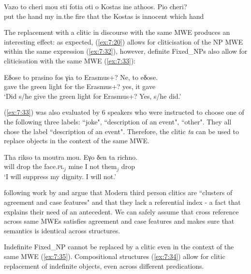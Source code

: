 \documentclass[output=paper]{langsci/langscibook}
\begin{document}
\begin{exe}%
\ex \label{ex:7:31}
\gll     Vazo to cheri mou sti fotia oti o Kostas ine athoos. Pio cheri? \\
          put the hand my in.the fire that the Kostas is innocent which hand\\\nolinebreak
{}
\end{exe}


The replacement with a clitic in discourse with the same MWE produces an interesting effect: as expected, (\ref{ex:7:20}) allows for cliticisation of the NP MWE within the same expression (\ref{ex:7:32}), however, definite Fixed\_NPs also allow for cliticisation with the same MWE (\ref{ex:7:33}):



\ea%
\label{ex:7:32}
\gll Eδose to prasino fos γia to Erasmus+? Ne, to eδose.\\
 gave  the  green light for the Erasmus+? yes, it gave\\
\glt `Did s/he give the green light for Erasmus+? Yes, s/he did.’
\z

(\ref{ex:7:33}) was also evaluated by 6  speakers who were instructed to choose one of the following three labels: ``joke", ``description of an event", ``other". They all chose the label ``description of an event". Therefore, the clitic {\normalfont \itshape ta} can be used to replace objects in the context of the same MWE.

\ea%
    \label{ex:7:33}
\gll Tha rikso ta moutra mou. Eγo δen ta richno. \\
     will drop the face.\textsc{pl}$_j$ mine I not them$_j$ drop\\
\glt `I will suppress my dignity. I will not.’
\z

\citet{tsimpli2007} following work by \citet{cardinaletti1999} and \citet{stavrakaki1999} argue that Modern  third person clitics are ``clusters of agreement and case features" and that they lack a referential index - a fact that explains their need of an  antecedent.  We can safely assume that cross reference across same MWEs satisfies agreement and case features and makes sure that semantics is identical across structures.  

Indefinite Fixed\_NP cannot be replaced by a clitic even in the context of the same MWE (\ref{ex:7:35}). Compositional structures (\ref{ex:7:34}) allow for clitic replacement of indefinite objects, even across different predications.
\end{document}
